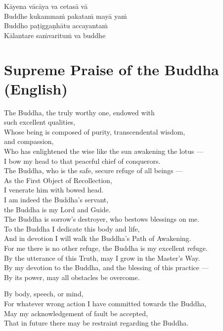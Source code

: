 
Kāyena vācāya va cetasā vā\\
Buddhe kukammaṁ pakataṁ mayā yaṁ\\
Buddho paṭiggaṇhātu accayantaṁ\\
Kālantare saṁvarituṁ va buddhe

\section*{Supreme Praise of the Buddha (English)}

\begin{leader}
\end{leader}

The Buddha, the truly worthy one, endowed with\\
\vin such excellent qualities,\\
Whose being is composed of purity, transcendental wisdom,\\
\vin and compassion,\\
Who has enlightened the wise like the sun awakening the lotus ---\\
I bow my head to that peaceful chief of conquerors.\\
The Buddha, who is the safe, secure refuge of all beings ---\\
As the First Object of Recollection,\\\vin I venerate him with bowed head.\\
I am indeed the Buddha's servant,\\\vin the Buddha is my Lord and Guide.\\
The Buddha is sorrow's destroyer, who bestows blessings on me.\\
To the Buddha I dedicate this body and life,\\
And in devotion I will walk the Buddha's Path of Awakening.\\
For me there is no other refuge, the Buddha is my excellent refuge.\\
By the utterance of this Truth, may I grow in the Master's Way.\\
By my devotion to the Buddha, and the blessing of this practice ---\\
By its power, may all obstacles be overcome.


By body, speech, or mind,\\
For whatever wrong action I have committed towards the Buddha,\\
May my acknowledgement of fault be accepted,\\
That in future there may be restraint regarding the Buddha.

